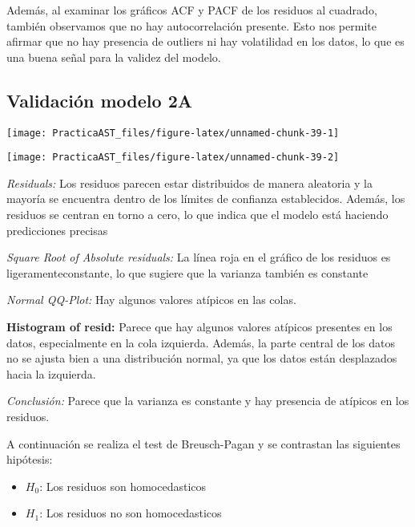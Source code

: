 \documentclass[
]{article}
\providecommand{\tightlist}{%
  \setlength{\itemsep}{0pt}\setlength{\parskip}{0pt}}
\begin{document}
Además, al examinar los gráficos ACF y PACF de los residuos al cuadrado,
también observamos que no hay autocorrelación presente. Esto nos permite
afirmar que no hay presencia de outliers ni hay volatilidad en los
datos, lo que es una buena señal para la validez del modelo.

\medskip

\hypertarget{validaciuxf3n-modelo-2a}{%
\subsection{Validación modelo 2A}\label{validaciuxf3n-modelo-2a}}

\begin{center}\texttt{[image: PracticaAST\_files/figure-latex/unnamed-chunk-39-1]} \end{center}

\begin{center}\texttt{[image: PracticaAST\_files/figure-latex/unnamed-chunk-39-2]} \end{center}

\emph{Residuals:} Los residuos parecen estar distribuidos de manera
aleatoria y la mayoría se encuentra dentro de los límites de confianza
establecidos. Además, los residuos se centran en torno a cero, lo que
indica que el modelo está haciendo predicciones precisas

\emph{Square Root of Absolute residuals:} La línea roja en el gráfico de
los residuos es ligeramenteconstante, lo que sugiere que la varianza
también es constante

\emph{Normal QQ-Plot:} Hay algunos valores atípicos en las colas.

\textbf{Histogram of resid:} Parece que hay algunos valores atípicos
presentes en los datos, especialmente en la cola izquierda. Además, la
parte central de los datos no se ajusta bien a una distribución normal,
ya que los datos están desplazados hacia la izquierda.

\emph{Conclusión:} Parece que la varianza es constante y hay presencia
de atípicos en los residuos.

\medskip

A continuación se realiza el test de Breusch-Pagan y se contrastan las
siguientes hipótesis:

\begin{itemize}
\tightlist
\item
  \(H_0\): Los residuos son homocedasticos
\item
  \(H_1\): Los residuos no son homocedasticos
\end{itemize}
\end{document}
